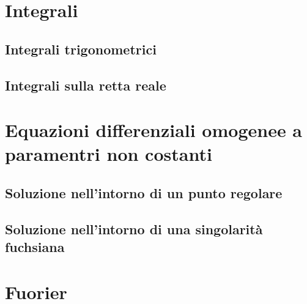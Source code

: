 \documentclass[x11names]{article}
\title{}
\author{Matteo Herz}
\date{}
\begin{document}
	

\tableofcontents
\newpage







\section{Integrali}
\subsection{Integrali trigonometrici}
\subsection{Integrali sulla retta reale}

\section{Equazioni differenziali omogenee a paramentri non costanti}
\subsection{Soluzione nell'intorno di un punto regolare}
\subsection{Soluzione nell'intorno di una singolarità fuchsiana}

\section{Fuorier}
\end{document}
